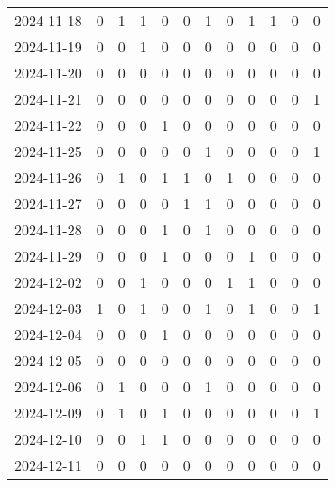 \documentclass[dvipdfmx,oneside]{article}
\begin{document}
\begin{tabular}{lccccccccccc}
        2024-11-18 &     0 &     1 &     1 &     0 &     0 &     1 &     0 &     1 &     1 &     0 &     0 \\
        2024-11-19 &     0 &     0 &     1 &     0 &     0 &     0 &     0 &     0 &     0 &     0 &     0 \\
        2024-11-20 &     0 &     0 &     0 &     0 &     0 &     0 &     0 &     0 &     0 &     0 &     0 \\
        2024-11-21 &     0 &     0 &     0 &     0 &     0 &     0 &     0 &     0 &     0 &     0 &     1 \\
        2024-11-22 &     0 &     0 &     0 &     1 &     0 &     0 &     0 &     0 &     0 &     0 &     0 \\
        2024-11-25 &     0 &     0 &     0 &     0 &     0 &     1 &     0 &     0 &     0 &     0 &     1 \\
        2024-11-26 &     0 &     1 &     0 &     1 &     1 &     0 &     1 &     0 &     0 &     0 &     0 \\
        2024-11-27 &     0 &     0 &     0 &     0 &     1 &     1 &     0 &     0 &     0 &     0 &     0 \\
        2024-11-28 &     0 &     0 &     0 &     1 &     0 &     1 &     0 &     0 &     0 &     0 &     0 \\
        2024-11-29 &     0 &     0 &     0 &     1 &     0 &     0 &     0 &     1 &     0 &     0 &     0 \\
        2024-12-02 &     0 &     0 &     1 &     0 &     0 &     0 &     1 &     1 &     0 &     0 &     0 \\
        2024-12-03 &     1 &     0 &     1 &     0 &     0 &     1 &     0 &     1 &     0 &     0 &     1 \\
        2024-12-04 &     0 &     0 &     0 &     1 &     0 &     0 &     0 &     0 &     0 &     0 &     0 \\
        2024-12-05 &     0 &     0 &     0 &     0 &     0 &     0 &     0 &     0 &     0 &     0 &     0 \\
        2024-12-06 &     0 &     1 &     0 &     0 &     0 &     1 &     0 &     0 &     0 &     0 &     0 \\
        2024-12-09 &     0 &     1 &     0 &     1 &     0 &     0 &     0 &     0 &     0 &     0 &     1 \\
        2024-12-10 &     0 &     0 &     1 &     1 &     0 &     0 &     0 &     0 &     0 &     0 &     0 \\
        2024-12-11 &     0 &     0 &     0 &     0 &     0 &     0 &     0 &     0 &     0 &     0 &     0 \\

\end{tabular}
\end{document}
